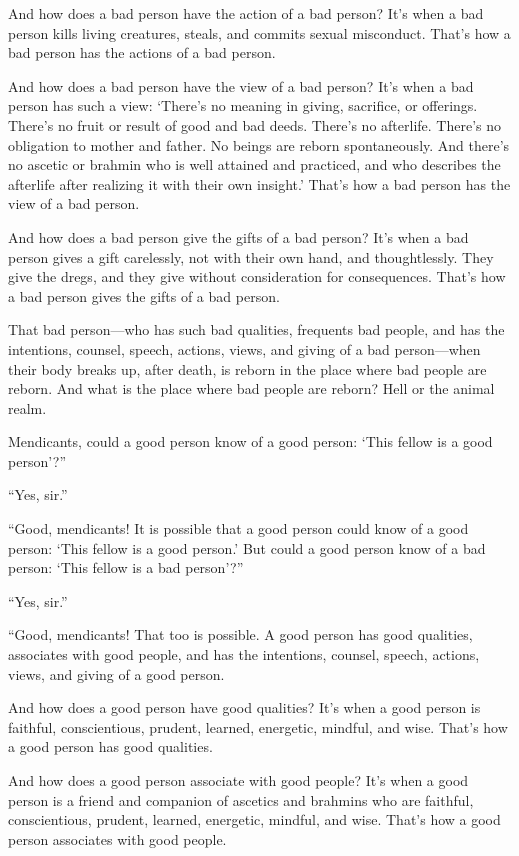 \documentclass[12pt,openany]{book}%
\begin{document}
And how does a bad person have the action of a bad person? It’s when a bad person kills living creatures, steals, and commits sexual misconduct. That’s how a bad person has the actions of a bad person. 

And how does a bad person have the view of a bad person? It’s when a bad person has such a view: ‘There’s no meaning in giving, sacrifice, or offerings. There’s no fruit or result of good and bad deeds. There’s no afterlife. There’s no obligation to mother and father. No beings are reborn spontaneously. And there’s no ascetic or brahmin who is well attained and practiced, and who describes the afterlife after realizing it with their own insight.’ That’s how a bad person has the view of a bad person. 

And how does a bad person give the gifts of a bad person? It’s when a bad person gives a gift carelessly, not with their own hand, and thoughtlessly. They give the dregs, and they give without consideration for consequences. That’s how a bad person gives the gifts of a bad person. 

That bad person—who has such bad qualities, frequents bad people, and has the intentions, counsel, speech, actions, views, and giving of a bad person—when their body breaks up, after death, is reborn in the place where bad people are reborn. And what is the place where bad people are reborn? Hell or the animal realm. 

Mendicants, could a good person know of a good person: ‘This fellow is a good person’?” 

“Yes, sir.” 

“Good, mendicants! It is possible that a good person could know of a good person: ‘This fellow is a good person.’ But could a good person know of a bad person: ‘This fellow is a bad person’?” 

“Yes, sir.” 

“Good, mendicants! That too is possible. A good person has good qualities, associates with good people, and has the intentions, counsel, speech, actions, views, and giving of a good person. 

And how does a good person have good qualities? It’s when a good person is faithful, conscientious, prudent, learned, energetic, mindful, and wise. That’s how a good person has good qualities. 

And how does a good person associate with good people? It’s when a good person is a friend and companion of ascetics and brahmins who are faithful, conscientious, prudent, learned, energetic, mindful, and wise. That’s how a good person associates with good people. 
\end{document}
